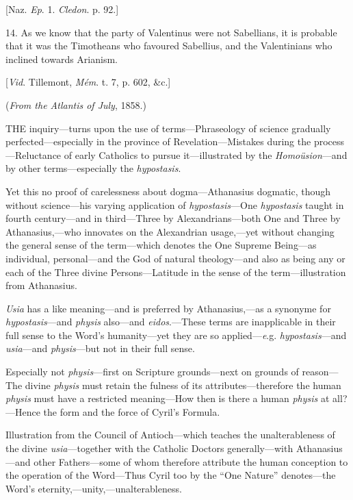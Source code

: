 [Naz. \emph{Ep}. 1. \emph{Cledon}. p. 92.]

14. As we know that the party of Valentinus were not Sabellians, it
is probable that it was the Timotheans who favoured Sabellius, and the
Valentinians who inclined towards Arianism.

[\emph{Vid}. Tillemont, \emph{Mém}. t. 7, p. 602, \&c.]


(\emph{From the Atlantis of July}, 1858.)


THE
inquiry—turns upon the use of terms—Phraseology of science
gradually perfected—especially in the province of
Revelation—Mistakes during the process—Reluctance of early
Catholics to pursue it—illustrated by the \emph{Homoüsion}—and by
other terms—especially the \emph{hypostasis}.

Yet this no proof of
carelessness about dogma—Athanasius dogmatic, though without
science—his varying application of \emph{hypostasis}—One \emph{hypostasis}
taught in fourth century—and in third—Three by Alexandrians—both
One and Three by Athanasius,—who innovates on the Alexandrian
usage,—yet without changing the general sense of the term—which
denotes the One Supreme Being—as individual, personal—and the God
of natural theology—and also as being any or each of the Three
divine Persons—Latitude in the sense of the term—illustration from
Athanasius.

\emph{Usia}
has a like meaning—and is preferred by Athanasius,—as a synonyme
for \emph{hypostasis}—and \emph{physis} also—and \emph{eidos}.—These
terms are inapplicable in their full sense to the Word's
humanity—yet they are so applied—\emph{e}.g. \emph{hypostasis}—and
\emph{usia}—and \emph{physis}—but not in their full sense.

Especially not \emph{physis}—first
on Scripture grounds—next on grounds of reason—The divine \emph{physis}
must retain the fulness of its attributes—therefore the human \emph{physis}
must have a restricted meaning—How then is there a human \emph{physis}
at all?—Hence the form and the force of Cyril's Formula.

Illustration from the Council
of Antioch—which teaches the unalterableness of the divine \emph{usia}—together
with the Catholic Doctors generally—with Athanasius—and other
Fathers—some of whom therefore attribute the human conception to the
operation of the Word—Thus Cyril too by the ``One Nature''
denotes—the Word's eternity,—unity,—unalterableness.

